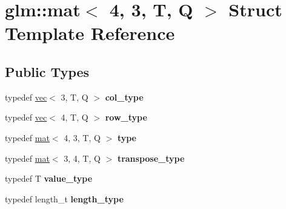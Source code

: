 \hypertarget{structglm_1_1mat_3_014_00_013_00_01T_00_01Q_01_4}{}\section{glm\+:\+:mat$<$ 4, 3, T, Q $>$ Struct Template Reference}
\label{structglm_1_1mat_3_014_00_013_00_01T_00_01Q_01_4}
\subsection*{Public Types}
\begin{DoxyCompactItemize}
\item 
\mbox{\label{structglm_1_1mat_3_014_00_013_00_01T_00_01Q_01_4_ab7cb76d6290691108c8af724270e3b6c}} 
typedef \hyperlink{structglm_1_1vec}{vec}$<$ 3, T, Q $>$ {\bfseries col\+\_\+type}
\item 
\mbox{\label{structglm_1_1mat_3_014_00_013_00_01T_00_01Q_01_4_ab68daf8d119fa525c762d6ba0bc08538}} 
typedef \hyperlink{structglm_1_1vec}{vec}$<$ 4, T, Q $>$ {\bfseries row\+\_\+type}
\item 
\mbox{\label{structglm_1_1mat_3_014_00_013_00_01T_00_01Q_01_4_a5c9dc0bf9dfa3af93210f80d90257861}} 
typedef \hyperlink{structglm_1_1mat}{mat}$<$ 4, 3, T, Q $>$ {\bfseries type}
\item 
\mbox{\label{structglm_1_1mat_3_014_00_013_00_01T_00_01Q_01_4_ab3a05b21cd6b51243140b2bdbf77108a}} 
typedef \hyperlink{structglm_1_1mat}{mat}$<$ 3, 4, T, Q $>$ {\bfseries transpose\+\_\+type}
\item 
\mbox{\label{structglm_1_1mat_3_014_00_013_00_01T_00_01Q_01_4_ad5a9ca85d27eb13ba59ee335bdb6783f}} 
typedef T {\bfseries value\+\_\+type}
\item 
\mbox{\label{structglm_1_1mat_3_014_00_013_00_01T_00_01Q_01_4_a24f0f2085bebe0a6e79da267368e74f5}} 
typedef length\+\_\+t {\bfseries length\+\_\+type}
\end{DoxyCompactItemize}
